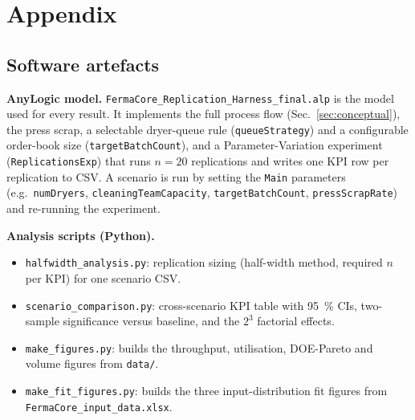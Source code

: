 \section*{Appendix}
\label{sec:appendix}



\subsection*{Software artefacts}

\textbf{AnyLogic model.} \texttt{FermaCore\_Replication\_Harness\_final.alp}
is the model used for every result. It implements the full process flow
(Sec.~\ref{sec:conceptual}), the press scrap, a selectable dryer-queue rule
(\texttt{queueStrategy}) and a configurable order-book size
(\texttt{targetBatchCount}), and a Parameter-Variation experiment
(\texttt{ReplicationsExp}) that runs $n=20$ replications and writes one KPI row
per replication to CSV. A scenario is run by setting the \texttt{Main} parameters
(e.g.\ \texttt{numDryers}, \texttt{cleaningTeamCapacity}, \texttt{targetBatchCount},
\texttt{pressScrapRate}) and re-running the experiment.

\textbf{Analysis scripts (Python).}
\begin{itemize}\setlength\itemsep{0pt}
  \item \texttt{halfwidth\_analysis.py}: replication sizing (half-width method, required $n$ per KPI) for one scenario CSV.
  \item \texttt{scenario\_comparison.py}: cross-scenario KPI table with \SI{95}{\percent} CIs, two-sample significance versus baseline, and the $2^3$ factorial effects.
  \item \texttt{make\_figures.py}: builds the throughput, utilisation, DOE-Pareto and volume figures from \texttt{data/}.
  \item \texttt{make\_fit\_figures.py}: builds the three input-distribution fit figures from \texttt{FermaCore\_input\_data.xlsx}.
\end{itemize}
